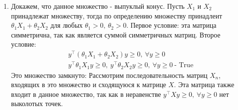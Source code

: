 \documentclass{article}
\begin{document}
\begin{enumerate}
          Найдём конус $\mathcal{K}^* = \{(x^*, \ y^*, \ z^*) \ | \ xx^* + yy^* + zz^* \geq 0\}$. Заметим, что в оригинальном конусе $z$ не ограничено сверху, следовательно $z^* \geq 0$. Тогда справедливо, что
          \[
              xx^* + yy^* + zz^* \geq xx^* + yy^* + ye^{\frac{x}{y}}z^*
          \]
          \begin{align*}
               & xx^* + yy^* + ye^{\frac{x}{y}}z^* \geq 0
          \end{align*}
          Поделим обе части неравенства на $y$ и сделаем замену $w = \frac{x}{y}$:
          \begin{align*}
              tx^* + y^* + e^tz^* \geq 0
          \end{align*}
          При $t \to 0$ выражение принимает вид $y^* + z^* \geq 0$. Так как $t$ не ограничено снизу, $x^* \leq 0$. Тогда чтобы найти границы $y^*$ рассмотрим минимум этой функции в зависимости от $t$:
          \[
              \frac{df(t)}{dt} = x^* + e^tz^* = 0
          \]
          Откуда $t = \ln{(-\frac{x^*}{z^*})}$, в этой точке значение функции:
          \[
              x^*\ln{(-\frac{x^*}{z^*})} + y^* - x^* \geq 0
          \]
          Откуда $y \geq x^*(1 - \ln{(-\frac{x^*}{z^*})})$
          Получаем:
          \[
              \mathcal{K}^* = \{(x^*, \ y^*, \ z^*) \ | \ x^* \leq 0, \ z^* \geq 0, \ y \geq x^*(1 - \ln{(-\frac{x^*}{z^*})})\}
          \]
    \item Докажем, что данное множество - выпуклый конус. Пусть $X_1$ и $X_2$ принадлежат множеству, тогда по определению множеству принадлеит $\theta_1 X_1 + \theta_2 X_2$ для любых $\theta_1 > 0, \ \theta_2 > 0$. Первое условие: эта матрица симметрична, так как является суммой симметричных матриц. Второе условие:
          \begin{align*}
               & y^\top (\theta_1 X_1 + \theta_2 X_2) y \geq 0, \ \forall y \geq 0                                \\
               & y^\top \theta_1 X_1 y \geq 0, \ y^\top \theta_2 X_2 y \geq 0, \ \forall y \geq 0 \ \text{- True}
          \end{align*}
          Это множество замкнуто: Рассмотрим последовательность матриц $X_n$, входящих в это множество и сходящуюся к матрице $X$. Эта матрица также входит в данное множество, так как в неравенстве $y^\top Xy \geq 0, \ \forall y \geq 0$ нет выколотых точек.


\end{enumerate}
\end{document}
